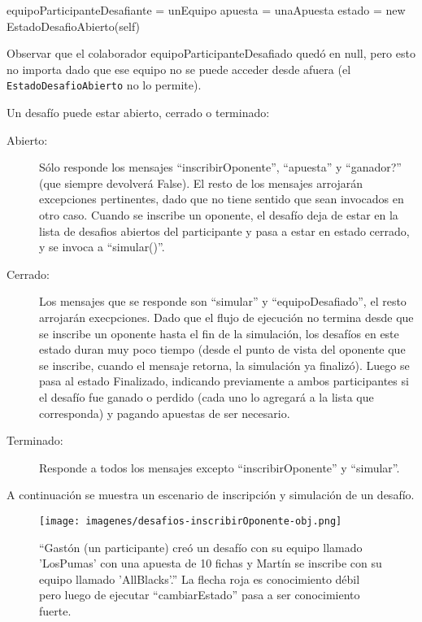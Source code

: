 \begin{algorithmic}
	  \State equipoParticipanteDesafiante = unEquipo
	  \State apuesta = unaApuesta
	  \State estado = new EstadoDesafioAbierto(self)
	\EndFunction
\end{algorithmic}

Observar que el colaborador equipoParticipanteDesafiado quedó en null, pero esto no importa dado que ese equipo no se puede acceder desde
afuera (el {\tt EstadoDesafioAbierto} no lo permite).

Un desafío puede estar abierto, cerrado o terminado:
\begin{description}
 \item[Abierto:] Sólo responde los mensajes ``inscribirOponente'', ``apuesta'' y ``ganador?'' (que siempre devolverá False). El resto de los mensajes
 arrojarán excepciones pertinentes, dado que no tiene sentido que sean invocados en otro caso. Cuando se inscribe un oponente, el desafío deja de estar
 en la lista de desafios abiertos del participante y pasa a estar en estado cerrado, y se invoca a ``simular()''.
 \item[Cerrado:] Los mensajes que se responde son ``simular'' y ``equipoDesafiado'', el resto arrojarán execpciones. Dado que el flujo de ejecución no termina
 desde que se inscribe un oponente hasta el fin de la simulación, los desafíos en este estado duran muy poco tiempo (desde el punto de vista del oponente
 que se inscribe, cuando el mensaje retorna, la simulación ya finalizó). Luego se pasa al estado Finalizado, indicando previamente a ambos participantes
 si el desafío fue ganado o perdido (cada uno lo agregará a la lista que corresponda) y pagando apuestas de ser necesario.
 \item[Terminado:] Responde a todos los mensajes excepto ``inscribirOponente'' y ``simular''.
\end{description}

A continuación se muestra un escenario de inscripción y simulación de un desafío.

  \begin{figure}[h!]
   \texttt{[image: imagenes/desafios-inscribirOponente-obj.png]}
   
   \caption{``Gastón (un participante) creó un desafío con su equipo llamado 'LosPumas' con una apuesta de 10 fichas y Martín se inscribe con su equipo llamado 
'AllBlacks'.'' La flecha roja es conocimiento débil pero luego de ejecutar ``cambiarEstado'' pasa a ser conocimiento fuerte.}
  \end{figure}
  
